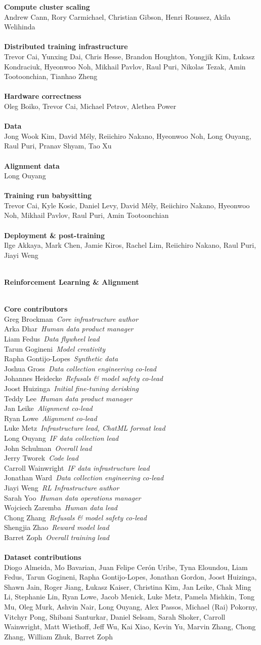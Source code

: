\documentclass{article}
\newcommand{\creditsectionheader}[1]{\parbox{\columnwidth}{\centering \textbf{\small #1}}\\}
\newcommand{\creditlistheader}[1]{\textbf{#1}\footnotemark[\thefootnote]\\}
\newcommand{\creditlist}[2]{\creditlistheader{#1}#2\\
\\}
\newcommand{\corecontributor}[2]{#1\ \textit{#2}\\}
\begin{document}
\begin{multicols}{2}
\creditlist{Compute cluster scaling}{Andrew Cann, Rory Carmichael, Christian Gibson, Henri Roussez, Akila Welihinda}
\creditlist{Distributed training infrastructure}{Trevor Cai, Yunxing Dai, Chris Hesse, Brandon Houghton, Yongjik Kim, Łukasz Kondraciuk, Hyeonwoo Noh, Mikhail Pavlov, Raul Puri, Nikolas Tezak, Amin Tootoonchian, Tianhao Zheng}
\creditlist{Hardware correctness}{Oleg Boiko, Trevor Cai, Michael Petrov, Alethea Power}
\creditlist{Data}{Jong Wook Kim, David Mély, Reiichiro Nakano, Hyeonwoo Noh, Long Ouyang, Raul Puri, Pranav Shyam, Tao Xu}
\creditlist{Alignment data}{Long Ouyang}
\creditlist{Training run babysitting}{Trevor Cai, Kyle Kosic, Daniel Levy, David Mély, Reiichiro Nakano, Hyeonwoo Noh, Mikhail Pavlov, Raul Puri, Amin Tootoonchian}
\creditlist{Deployment \& post-training}{Ilge Akkaya, Mark Chen, Jamie Kiros, Rachel Lim, Reiichiro Nakano, Raul Puri, Jiayi Weng}
\creditsectionheader{Reinforcement Learning \& Alignment}
\creditlistheader{Core contributors}
\corecontributor{Greg Brockman}{Core infrastructure author}
\corecontributor{Arka Dhar}{Human data product manager}
\corecontributor{Liam Fedus}{Data flywheel lead}
\corecontributor{Tarun Gogineni}{Model creativity}
\corecontributor{Rapha Gontijo-Lopes}{Synthetic data}
\corecontributor{Joshua Gross}{Data collection engineering co-lead}
\corecontributor{Johannes Heidecke}{Refusals \& model safety co-lead}
\corecontributor{Joost Huizinga}{Initial fine-tuning derisking}
\corecontributor{Teddy Lee}{Human data product manager}
\corecontributor{Jan Leike}{Alignment co-lead}
\corecontributor{Ryan Lowe}{Alignment co-lead}
\corecontributor{Luke Metz}{Infrastructure lead, ChatML format lead}
\corecontributor{Long Ouyang}{IF data collection lead}
\corecontributor{John Schulman}{Overall lead}
\corecontributor{Jerry Tworek}{Code lead}
\corecontributor{Carroll Wainwright}{IF data infrastructure lead}
\corecontributor{Jonathan Ward}{Data collection engineering co-lead}
\corecontributor{Jiayi Weng}{RL Infrastructure author}
\corecontributor{Sarah Yoo}{Human data operations manager}
\corecontributor{Wojciech Zaremba}{Human data lead}
\corecontributor{Chong Zhang}{Refusals \& model safety co-lead}
\corecontributor{Shengjia Zhao}{Reward model lead}
\corecontributor{Barret Zoph}{Overall training lead}
\\
\creditlist{Dataset contributions}{Diogo Almeida, Mo Bavarian, Juan Felipe Cerón Uribe, Tyna Eloundou, Liam Fedus, Tarun Gogineni, Rapha Gontijo-Lopes, Jonathan Gordon, Joost Huizinga, Shawn Jain, Roger Jiang, Łukasz Kaiser, Christina Kim, Jan Leike, Chak Ming Li, Stephanie Lin, Ryan Lowe, Jacob Menick, Luke Metz, Pamela Mishkin, Tong Mu, Oleg Murk, Ashvin Nair, Long Ouyang, Alex Passos, Michael (Rai) Pokorny, Vitchyr Pong, Shibani Santurkar, Daniel Selsam, Sarah Shoker, Carroll Wainwright, Matt Wiethoff, Jeff Wu, Kai Xiao, Kevin Yu, Marvin Zhang, Chong Zhang, William Zhuk, Barret Zoph}

\end{multicols}
\end{document}
